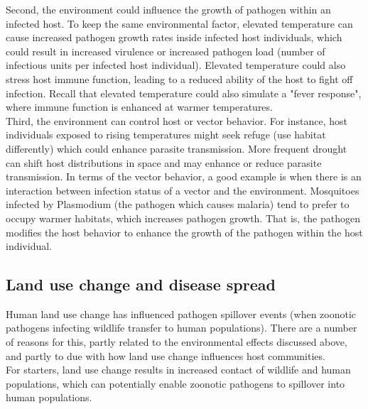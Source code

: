 \documentclass[12pt]{article}
\begin{document}
Second, the environment could influence the growth of pathogen within an infected host. To keep the same environmental factor, elevated temperature can cause increased pathogen growth rates inside infected host individuals, which could result in increased virulence or increased pathogen load (number of infectious units per infected host individual). Elevated temperature could also stress host immune function, leading to a reduced ability of the host to fight off infection. Recall that elevated temperature could also simulate a "fever response", where immune function is enhanced at warmer temperatures. \\



Third, the environment can control host or vector behavior. For instance, host individuals exposed to rising temperatures might seek refuge (use habitat differently) which could enhance parasite transmission. More frequent drought can shift host distributions in space and may enhance or reduce parasite transmission. In terms of the vector behavior, a good example is when there is an interaction between infection status of a vector and the environment. Mosquitoes infected by Plasmodium (the pathogen which causes malaria) tend to prefer to occupy warmer habitats, which increases pathogen growth. That is, the pathogen modifies the host behavior to enhance the growth of the pathogen within the host individual. \\











\bigskip

\subsection*{Land use change and disease spread}

Human land use change has influenced pathogen spillover events (when zoonotic pathogens infecting wildlife transfer to human populations). There are a number of reasons for this, partly related to the environmental effects discussed above, and partly to due with how land use change influences host communities. \\

For starters, land use change results in increased contact of wildlife and human populations, which can potentially enable zoonotic pathogens to spillover into human populations. \\
\end{document}
